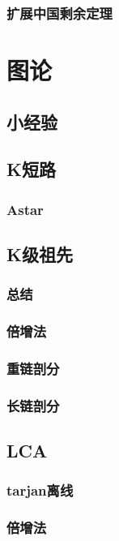 \documentclass[10pt,a4paper]{article}
\begin{document}
\subsubsection{扩展中国剩余定理}

\section{图论}
\subsection{小经验}

\subsection{K短路}
\subsubsection{Astar}

\subsection{K级祖先}
\subsubsection{总结}

\subsubsection{倍增法}

\subsubsection{重链剖分}

\subsubsection{长链剖分}

\subsection{LCA}
\subsubsection{tarjan离线}

\subsubsection{倍增法}

\end{document}
